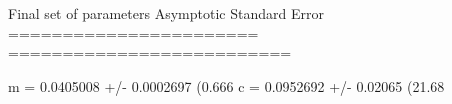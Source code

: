 Final set of parameters            Asymptotic Standard Error
=======================            ==========================

m               = 0.0405008        +/- 0.0002697    (0.666%
c               = 0.0952692        +/- 0.02065      (21.68%